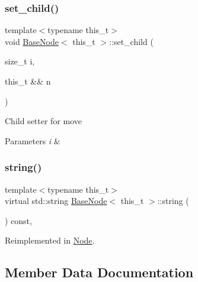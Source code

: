 \subsubsection{\texorpdfstring{set\+\_\+child()}{set\_child()}\hspace{0.1cm}{\footnotesize\ttfamily [2/2]}}
{\footnotesize\ttfamily template$<$typename this\+\_\+t$>$ \\
void \hyperlink{class_base_node}{Base\+Node}$<$ this\+\_\+t $>$\+::set\+\_\+child (\begin{DoxyParamCaption}\item[{size\+\_\+t}]{i,  }\item[{this\+\_\+t \&\&}]{n }\end{DoxyParamCaption})\hspace{0.3cm}{\ttfamily [inline]}}

Child setter for move 
\begin{DoxyParams}{Parameters}
{\em i} & \\
\hline
\end{DoxyParams}
\mbox{\label{class_base_node_ac26bf9f89abeaca8d43b73f2d8d1d9cf}} 
\subsubsection{\texorpdfstring{string()}{string()}}
{\footnotesize\ttfamily template$<$typename this\+\_\+t$>$ \\
virtual std\+::string \hyperlink{class_base_node}{Base\+Node}$<$ this\+\_\+t $>$\+::string (\begin{DoxyParamCaption}{ }\end{DoxyParamCaption}) const\hspace{0.3cm}{\ttfamily [inline]}, {\ttfamily [virtual]}}



Reimplemented in \hyperlink{class_node_a2c58ff9b0904718f568ac71f499cd17f}{Node}.



\subsection{Member Data Documentation}
\mbox{\label{class_base_node_af2f245862083d173c950fca048c03546}} 
